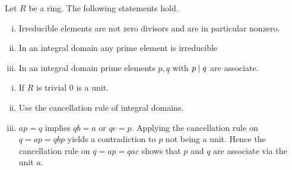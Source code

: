 	\begin{lemma}
		Let $R$ be a ring. The following statements hold.
		\begin{enumerate}[(i)]
			\item{
				Irreducible elements are not zero divisors and are in particular nonzero.
			}
			\item{
				In an integral domain any prime element is irreducible
			}
			\item{
				In an integral domain prime elements $p,q$ with $p \mid q$ are associate.
			}
		\end{enumerate}
	\end{lemma}
	\begin{sketch}
		\begin{enumerate}[(i)]
			\item{
				If $R$ is trivial $0$ is a unit.
			}
			\item{
				Use the cancellation rule of integral domains.
			}
			\item{
				$ap=q$ implies $qb=a$ or $qc=p$. Applying the cancellation rule on $q=ap=qbp$ yields a contradiction to $p$ not being a unit. Hence the cancellation rule on $q=ap=qac$ shows that $p$ and $q$ are associate via the unit $a$.
			}
		\end{enumerate}
	\end{sketch}

